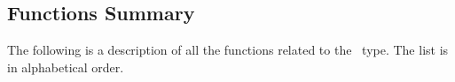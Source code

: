 \subsection{Functions Summary}
\label{signals_float-signals_function}

The following is a description of all the functions related to 
the \fsignal\ type. The list is in alphabetical order.

\newpage %


